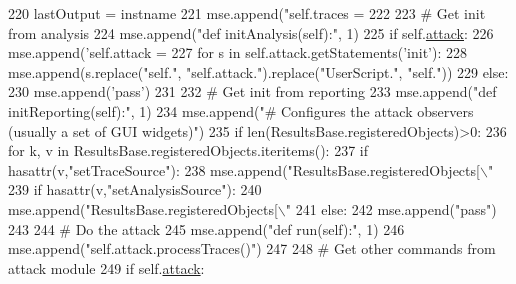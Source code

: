 \begin{DoxyCode}
{{{{220                 lastOutput = instname
221         mse.append(\textcolor{stringliteral}{"self.traces = %
222 
223         \textcolor{comment}{# Get init from analysis}
224         mse.append(\textcolor{stringliteral}{"def initAnalysis(self):"}, 1)
225         \textcolor{keywordflow}{if} self.\hyperlink{classsoftware_1_1chipwhisperer_1_1analyzer_1_1utils_1_1attackscriptgen_1_1AttackScriptGen_a89227b42af2b2b07eebce4ac962554cb}{attack}:
226             mse.append(\textcolor{stringliteral}{'self.attack = %
227             \textcolor{keywordflow}{for} s \textcolor{keywordflow}{in} self.attack.getStatements(\textcolor{stringliteral}{'init'}):
228                 mse.append(s.replace(\textcolor{stringliteral}{"self."}, \textcolor{stringliteral}{"self.attack."}).replace(\textcolor{stringliteral}{"UserScript."}, \textcolor{stringliteral}{"self."}))
229         \textcolor{keywordflow}{else}:
230             mse.append(\textcolor{stringliteral}{'pass'})
231 
232         \textcolor{comment}{# Get init from reporting}
233         mse.append(\textcolor{stringliteral}{"def initReporting(self):"}, 1)
234         mse.append(\textcolor{stringliteral}{"# Configures the attack observers (usually a set of GUI widgets)"})
235         \textcolor{keywordflow}{if} len(ResultsBase.registeredObjects)>0:
236             \textcolor{keywordflow}{for} k, v \textcolor{keywordflow}{in} ResultsBase.registeredObjects.iteritems():
237                 \textcolor{keywordflow}{if} hasattr(v,\textcolor{stringliteral}{"setTraceSource"}):
238                     mse.append(\textcolor{stringliteral}{"ResultsBase.registeredObjects[\(\backslash\)"%
239                 \textcolor{keywordflow}{if} hasattr(v,\textcolor{stringliteral}{"setAnalysisSource"}):
240                     mse.append(\textcolor{stringliteral}{"ResultsBase.registeredObjects[\(\backslash\)"%
241         \textcolor{keywordflow}{else}:
242             mse.append(\textcolor{stringliteral}{"pass"})
243 
244         \textcolor{comment}{# Do the attack}
245         mse.append(\textcolor{stringliteral}{"def run(self):"}, 1)
246         mse.append(\textcolor{stringliteral}{"self.attack.processTraces()"})
247 
248         \textcolor{comment}{# Get other commands from attack module}
249         \textcolor{keywordflow}{if} self.\hyperlink{classsoftware_1_1chipwhisperer_1_1analyzer_1_1utils_1_1attackscriptgen_1_1AttackScriptGen_a89227b42af2b2b07eebce4ac962554cb}{attack}:
}}}}}}}}
\end{DoxyCode}
